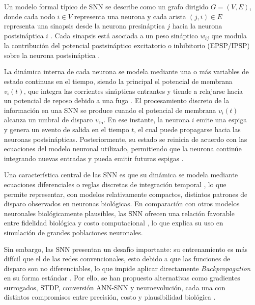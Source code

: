 Un modelo formal típico de SNN se describe como un grafo dirigido $G = (V, E)$, donde cada nodo $i \in V$ representa una neurona y cada arista $(j,i) \in E$ representa una sinapsis desde la neurona presináptica $j$ hacia la neurona postsináptica $i$ \cite{Hwang2020snnmembranepotential, Yamazaki2022snnapplications}. Cada sinapsis está asociada a un peso sináptico $w_{ij}$ \cite{Sanaullah2023snnmathematicalmodels} que modula la contribución del potencial postsináptico excitatorio o inhibitorio (EPSP/IPSP) sobre la neurona postsináptica \cite{Hwang2020snnmembranepotential}.

La dinámica interna de cada neurona se modela mediante una o más variables de estado continuas en el tiempo, siendo la principal el potencial de membrana $v_i(t)$, que integra las corrientes sinápticas entrantes y tiende a relajarse hacia un potencial de reposo debido a una fuga \cite{Fontaine2014spiketresholdmembrane}. El procesamiento discreto de la información en una SNN se produce cuando el potencial de membrana \(v_i(t)\) alcanza un umbral de disparo \(v_{\text{th}}\). En ese instante, la neurona \(i\) emite una espiga y genera un evento de salida en el tiempo \(t\), el cual puede propagarse hacia las neuronas postsinápticas. Posteriormente, su estado se reinicia de acuerdo con las ecuaciones del modelo neuronal utilizado, permitiendo que la neurona continúe integrando nuevas entradas y pueda emitir futuras espigas \cite{Izhikevich2003}.

Una característica central de las SNN es que su dinámica se modela mediante ecuaciones diferenciales o reglas discretas de integración temporal \cite{Izhikevich2003}, lo que permite representar, con modelos relativamente compactos, distintos patrones de disparo observados en neuronas biológicas. En comparación con otros modelos neuronales biológicamente plausibles, las SNN ofrecen una relación favorable entre fidelidad biológica y costo computacional \cite{Schuman2022Opportunities}, lo que explica su uso en simulación de grandes poblaciones neuronales.

Sin embargo, las SNN presentan un desafío importante: su entrenamiento es más difícil que el de las redes convencionales, esto debido a que las funciones de disparo son no diferenciables, lo que impide aplicar directamente \textit{Backpropagation} en su forma estándar \cite{10.3389/fnins.2024.1383844directtrainingsnn}. Por ello, se han propuesto alternativas como gradientes surrogados, STDP, conversión ANN-SNN y neuroevolución, cada una con distintos compromisos entre precisión, costo y plausibilidad biológica \cite{Schuman2022Opportunities}.

